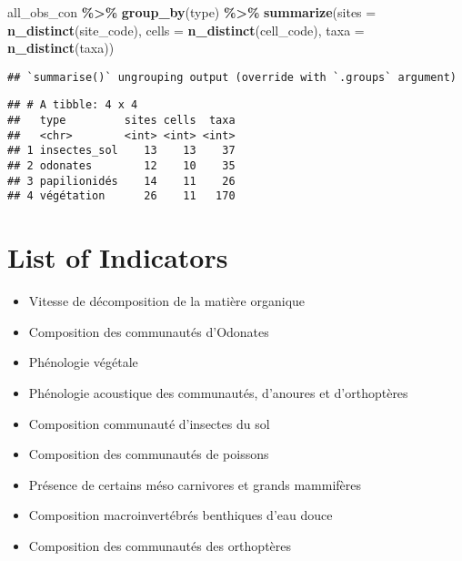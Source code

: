 \documentclass[
]{book}
\newenvironment{Shaded}{\begin{snugshade}}{\end{snugshade}}
\newcommand{\DataTypeTok}[1]{\textcolor[rgb]{0.13,0.29,0.53}{#1}}
\newcommand{\KeywordTok}[1]{\textcolor[rgb]{0.13,0.29,0.53}{\textbf{#1}}}
\newcommand{\NormalTok}[1]{#1}
\newcommand{\OperatorTok}[1]{\textcolor[rgb]{0.81,0.36,0.00}{\textbf{#1}}}
\newcommand{\StringTok}[1]{\textcolor[rgb]{0.31,0.60,0.02}{#1}}
\providecommand{\tightlist}{%
  \setlength{\itemsep}{0pt}\setlength{\parskip}{0pt}}
\begin{document}
\begin{Shaded}
\begin{Highlighting}[]
\NormalTok{all\_obs\_con }\OperatorTok{\%\textgreater{}\%}\StringTok{ }
\StringTok{  }\KeywordTok{group\_by}\NormalTok{(type) }\OperatorTok{\%\textgreater{}\%}\StringTok{ }
\StringTok{  }\KeywordTok{summarize}\NormalTok{(}\DataTypeTok{sites =} \KeywordTok{n\_distinct}\NormalTok{(site\_code),}
            \DataTypeTok{cells =} \KeywordTok{n\_distinct}\NormalTok{(cell\_code),}
            \DataTypeTok{taxa =} \KeywordTok{n\_distinct}\NormalTok{(taxa))}
\end{Highlighting}
\end{Shaded}

\begin{verbatim}
## `summarise()` ungrouping output (override with `.groups` argument)
\end{verbatim}

\begin{verbatim}
## # A tibble: 4 x 4
##   type         sites cells  taxa
##   <chr>        <int> <int> <int>
## 1 insectes_sol    13    13    37
## 2 odonates        12    10    35
## 3 papilionidés    14    11    26
## 4 végétation      26    11   170
\end{verbatim}

\hypertarget{list-of-indicators}{%
\section{List of Indicators}\label{list-of-indicators}}

\begin{itemize}
\tightlist
\item
  Vitesse de décomposition de la matière organique
\item
  Composition des communautés d'Odonates
\item
  Phénologie végétale
\item
  Phénologie acoustique des communautés, d'anoures et d'orthoptères
\item
  Composition communauté d'insectes du sol
\item
  Composition des communautés de poissons
\item
  Présence de certains méso carnivores et grands mammifères
\item
  Composition macroinvertébrés benthiques d'eau douce
\item
  Composition des communautés des orthoptères
\end{itemize}
\end{document}
